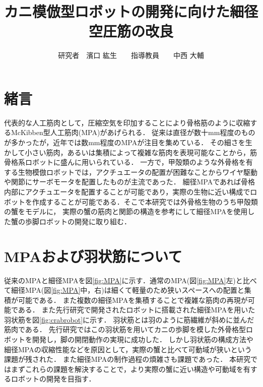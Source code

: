 \documentclass{jarticle}
\begin{document}

\title{
カニ模倣型ロボットの開発に向けた細径空圧筋の改良
}
\author{
研究者　濱口 紘生　　指導教員　　中西 大輔
}

\maketitle

\thispagestyle{empty}  %

\section{緒言}

代表的な人工筋肉として，圧縮空気を印加することにより骨格筋のように収縮するMcKibben型人工筋肉(MPA)があげられる．
従来は直径が数十mm程度のものが多かったが，近年では数mm程度のMPAが注目を集めている\cite{wakimoto}．
その細さを生かして小さい筋肉，あるいは集積によって複雑な筋肉を表現可能なことから，筋骨格系ロボットに盛んに用いられている\cite{wakimoto}．
一方で，甲殻類のような外骨格を有する生物模倣ロボットでは，アクチュエータの配置が困難なことからワイヤ駆動や関節にサーボモータを配置したものが主流であった\cite{crabrobot1}．
細径MPAであれば骨格内部にアクチュエータを配置することが可能であり，実際の生物に近い構成でロボットを作成することが可能である．そこで本研究では外骨格生物のうち甲殻類の蟹をモデルに，
実際の蟹の筋肉と関節の構造を参考にして細径MPAを使用した蟹の歩脚ロボットの開発に取り組む．

\vspace*{-2mm}
\section{MPAおよび羽状筋について}

従来のMPAと細径MPAを図\ref{fig:MPA}に示す．通常のMPA(図\ref{fig:MPA}左)と比べて細径MPA(図\ref{fig:MPA}中，右)は細くて軽量のため狭いスペースへの配置と集積が可能である．
また複数の細径MPAを集積することで複雑な筋肉の再現が可能である．
また先行研究\cite{crabrobot2}で開発されたロボットに搭載された細径MPAを用いた羽状筋を図\ref{fig:crabrobot}に示す．
羽状筋とは羽のように筋繊維が斜めに並んだ筋肉である．
先行研究\cite{crabrobot2}ではこの羽状筋を用いてカニの歩脚を模した外骨格型ロボットを開発し，脚の開閉動作の実現に成功した．
しかし羽状筋の構成方法や細径MPAの収縮性能などを原因として，実際の蟹と比べて可動域が狭いという課題が残された．
また細径MPAの制作過程の煩雑さも課題であった．
本研究ではまずこれらの課題を解決することで，より実際の蟹に近い構造や可動域を有するロボットの開発を目指す．
\end{document}
